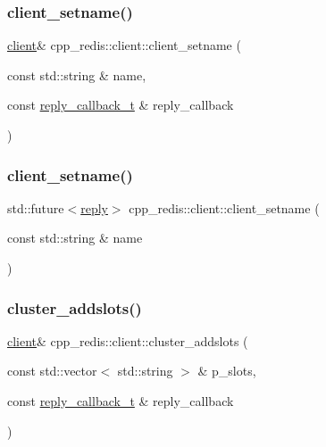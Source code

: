 \subsubsection{\texorpdfstring{client\+\_\+setname()}{client\_setname()}\hspace{0.1cm}{\footnotesize\ttfamily [1/2]}}
{\footnotesize\ttfamily \hyperlink{classcpp__redis_1_1client}{client}\& cpp\+\_\+redis\+::client\+::client\+\_\+setname (\begin{DoxyParamCaption}\item[{const std\+::string \&}]{name,  }\item[{const \hyperlink{classcpp__redis_1_1client_a061a1140d36d2eaeda82b09a0bb3f9f2}{reply\+\_\+callback\+\_\+t} \&}]{reply\+\_\+callback }\end{DoxyParamCaption})}

\mbox{\label{classcpp__redis_1_1client_aa1ab41fda6b2536f652720b7720a0b63}} 
\subsubsection{\texorpdfstring{client\+\_\+setname()}{client\_setname()}\hspace{0.1cm}{\footnotesize\ttfamily [2/2]}}
{\footnotesize\ttfamily std\+::future$<$\hyperlink{classcpp__redis_1_1reply}{reply}$>$ cpp\+\_\+redis\+::client\+::client\+\_\+setname (\begin{DoxyParamCaption}\item[{const std\+::string \&}]{name }\end{DoxyParamCaption})}

\mbox{\label{classcpp__redis_1_1client_ac156d5593e1800742188f0eee9016a84}} 
\subsubsection{\texorpdfstring{cluster\+\_\+addslots()}{cluster\_addslots()}\hspace{0.1cm}{\footnotesize\ttfamily [1/2]}}
{\footnotesize\ttfamily \hyperlink{classcpp__redis_1_1client}{client}\& cpp\+\_\+redis\+::client\+::cluster\+\_\+addslots (\begin{DoxyParamCaption}\item[{const std\+::vector$<$ std\+::string $>$ \&}]{p\+\_\+slots,  }\item[{const \hyperlink{classcpp__redis_1_1client_a061a1140d36d2eaeda82b09a0bb3f9f2}{reply\+\_\+callback\+\_\+t} \&}]{reply\+\_\+callback }\end{DoxyParamCaption})}

